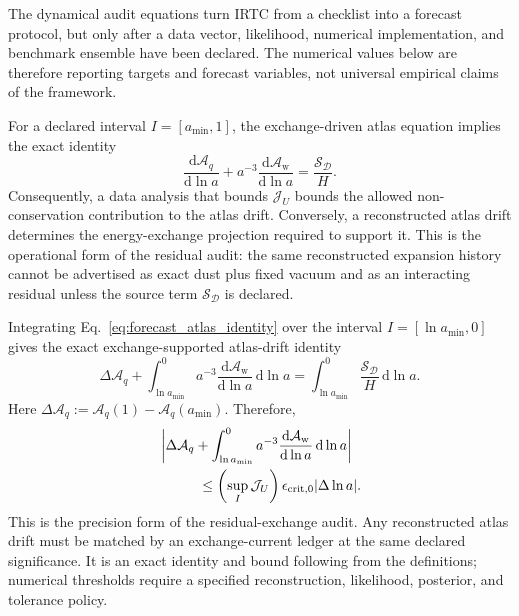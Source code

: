 \documentclass[
  aps,
  prd,
  reprint,
  superscriptaddress,
  floatfix,
  nofootinbib,
  longbibliography
]{revtex4-2}
\theoremstyle{plain}
\theoremstyle{definition}
\theoremstyle{remark}
\newcommand{\dd}{\mathrm d}
\newcommand{\D}{\mathcal D}
\newcommand{\crit}{\mathrm{crit}}
\newcommand{\Aq}{\mathcal A_q}
\newcommand{\Aw}{\mathcal A_{\mathrm w}}
\newcommand{\Jcal}{\mathcal J}
\newcommand{\Scal}{\mathcal S}
\begin{document}
The dynamical audit equations turn IRTC from a checklist into a forecast protocol, but only after a data vector, likelihood, numerical implementation, and benchmark ensemble have been declared.  The numerical values below are therefore reporting targets and forecast variables, not universal empirical claims of the framework.

For a declared interval $I=[a_{\min},1]$, the exchange-driven atlas equation implies the exact identity
\begin{equation}
\frac{\dd\Aq}{\dd\ln a}+a^{-3}\frac{\dd\Aw}{\dd\ln a}=\frac{\Scal_\D}{H}.
\label{eq:forecast_atlas_identity}
\end{equation}
Consequently, a data analysis that bounds $\Jcal_U$ bounds the allowed non-conservation contribution to the atlas drift.  Conversely, a reconstructed atlas drift determines the energy-exchange projection required to support it.  This is the operational form of the residual audit: the same reconstructed expansion history cannot be advertised as exact dust plus fixed vacuum and as an interacting residual unless the source term $\Scal_\D$ is declared.

Integrating Eq.~\eqref{eq:forecast_atlas_identity} over the interval $I=[\ln a_{\min},0]$ gives the exact exchange-supported atlas-drift identity
\begin{equation}
\boxed{
\Delta\Aq+
\int_{\ln a_{\min}}^{0}a^{-3}\frac{\dd\Aw}{\dd\ln a}\,\dd\ln a
=
\int_{\ln a_{\min}}^{0}\frac{\Scal_\D}{H}\,\dd\ln a .
}
\label{eq:integrated_atlas_eom}
\end{equation}
Here $\Delta\Aq:=\Aq(1)-\Aq(a_{\min})$.  Therefore,
\begin{equation}
\begin{aligned}
&\left|
\Delta\Aq+
\int_{\ln a_{\min}}^{0}a^{-3}\frac{\dd\Aw}{\dd\ln a}\,\dd\ln a
\right| \\
&\hspace{1.0cm}\le
\left(\sup_I\Jcal_U\right)\epsilon_{\crit,0}|\Delta\ln a| .
\end{aligned}
\label{eq:atlas_drift_bound}
\end{equation}
This is the precision form of the residual-exchange audit.  Any reconstructed atlas drift must be matched by an exchange-current ledger at the same declared significance.  It is an exact identity and bound following from the definitions; numerical thresholds require a specified reconstruction, likelihood, posterior, and tolerance policy.
\end{document}
